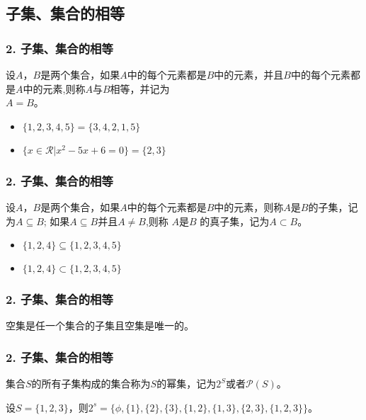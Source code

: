 \documentclass{beamer}
\begin{document}
\begin{CJK*}{UTF8}{gbsn}
\section{子集、集合的相等}
\begin{frame}
  \frametitle{2. 子集、集合的相等}

  \begin{Def}
    设$A$，$B$是两个集合，如果$A$中的每个元素都是$B$中的元素，并且$B$中的每个元素都是$A$中的元素,则称$A$与$B$\alert{相等}，并记为\\ $A=B$。
  \end{Def}
  \begin{itemize}
\pause
  \item   $\{1,2,3,4,5\} = \{3,4,2,1,5\}$
\pause
\item $\{x \in \mathcal{R} | x^2 -5x + 6 = 0\} = \{2,3\}$
  \end{itemize}
\end{frame}
\begin{frame}
  \frametitle{2. 子集、集合的相等}
  \begin{Def}
设$A$，$B$是两个集合，如果$A$中的每个元素都是$B$中的元素，则称$A$是$B$的\alert{子集}，记为$A \subseteq B$; 如果$A \subseteq B$并且$A \neq B$,则称 $A$是$B$ 的\alert{真子集}，记为$A\subset B$。    
  \end{Def}
  \begin{itemize}
\pause
  \item   $\{1,2,4\} \subseteq \{1,2,3,4,5\}$
\pause
\item $\{1,2,4\} \subset \{1,2,3,4,5\}$
  \end{itemize}
\end{frame}
\begin{frame}
  \frametitle{2. 子集、集合的相等}
  \begin{Thm}
   空集是任一个集合的子集且空集是唯一的。 
  \end{Thm}
\end{frame}
\begin{frame}
  \frametitle{2. 子集、集合的相等}

\begin{Def}
  集合$S$的所有子集构成的集合称为$S$的幂集，记为$2^S$或者$\mathcal{P}(S)$。
\end{Def}\pause
\begin{Ex}
  设$S=\{1,2,3\}$，则$2^s=\{\phi, \{1\},\{2\},\{3\},\{1,2\},\{1,3\},\{2,3\},\{1,2,3\}\}$。
\end{Ex}
\end{frame}

\end{CJK*}
\end{document}

